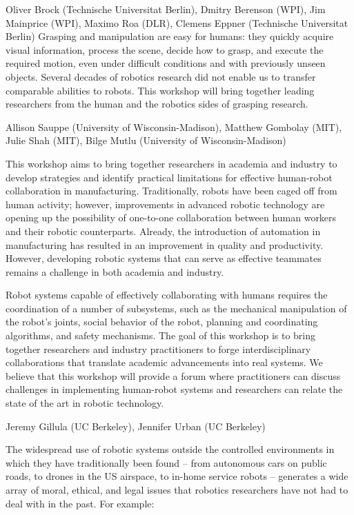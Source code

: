 \begin{spacing}{1.0}
{Oliver Brock (Technische Universitat Berlin), Dmitry Berenson (WPI), Jim Mainprice (WPI), Maximo Roa (DLR), Clemens Eppner (Technische Universitat Berlin)}
{
Grasping and manipulation are easy for humans: they quickly acquire visual information, process the scene, decide how to grasp, and execute the required motion, even under difficult conditions and with previously unseen objects. Several decades of robotics research did not enable us to transfer comparable abilities to robots. This workshop will bring together leading researchers from the human and the robotics sides of grasping research.
}


%
{Allison Sauppe (University of Wisconsin-Madison), Matthew Gombolay (MIT), Julie Shah (MIT), Bilge Mutlu (University of Wisconsin-Madison)}
{
This workshop aims to bring together researchers in academia and industry to develop strategies and identify practical limitations for effective human-robot collaboration in manufacturing. Traditionally, robots have been caged off from human activity; however, improvements in advanced robotic technology are opening up the possibility of one-to-one collaboration between human workers and their robotic counterparts. Already, the introduction of automation in manufacturing has resulted in an improvement in quality and productivity. However, developing robotic systems that can serve as effective teammates remains a challenge in both academia and industry.

Robot systems capable of effectively collaborating with humans requires the coordination of a number of subsystems, such as the mechanical manipulation of the robot’s joints, social behavior of the robot, planning and coordinating algorithms, and safety mechanisms. The goal of this workshop is to bring together researchers and industry practitioners to forge interdisciplinary collaborations that translate academic advancements into real systems. We believe that this workshop will provide a forum where practitioners can discuss challenges in implementing human-robot systems and researchers can relate the state of the art in robotic technology.
}

%
{Jeremy Gillula (UC Berkeley), Jennifer Urban (UC Berkeley)}
{
The widespread use of robotic systems outside the controlled environments in which they have traditionally been found – from autonomous cars on public roads, to drones in the US airspace, to in-home service robots – generates a wide array of moral, ethical, and legal issues that robotics researchers have not had to deal with in the past. For example:

}
\end{spacing}

